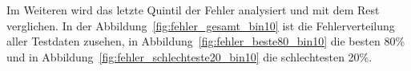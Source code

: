 \documentclass[pdftex,a4paper,halfparskip, article]{scrartcl}
\begin{document}

Im Weiteren wird das letzte Quintil der Fehler analysiert und mit dem Rest verglichen. In der Abbildung~\ref{fig:fehler_gesamt_bin10} ist die Fehlerverteilung aller Testdaten zusehen, in Abbildung~\ref{fig:fehler_beste80_bin10} die besten 80\% und in Abbildung~\ref{fig:fehler_schlechteste20_bin10} die schlechtesten 20\%. 
\end{document}
